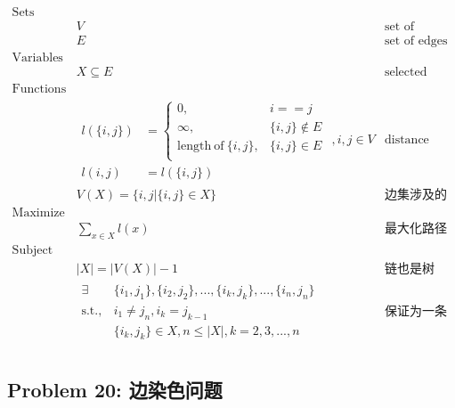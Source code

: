 \documentclass[11pt]{article}
\begin{document}
\begin{eqnarray*}
    \textrm{Sets} \\
        & V & \textrm{set of vertices} \\
        & E & \textrm{set of edges} \\
    \textrm{Variables} \\
        & X \subseteq E & \textrm{selected edges} \\
    \textrm{Functions} \\
        & \begin{array}{rl}
            l(\{i, j\}) &= \left\{
                \begin{array}{ll}
                    0,                              & i == j \\
                    \infty,                         & \{i, j\} \notin E \\
                    \mathrm{length\ of\ }\{i, j\},  & \{i, j\} \in E \\
                \end{array}
            \right. \\
            l(i, j) &= l(\{i, j\})
        \end{array}, i, j \in V & \textrm{distance between vertices} \\
        & V(X) = \{i, j | \{i, j\} \in X\} & \textrm{边集涉及的点集} \\
    \textrm{Maximize} \\
        & \displaystyle \sum_{x \in X} l(x) & \textrm{最大化路径长度} \\
    \textrm{Subject to} \\ 
        & |X| = |V(X)| - 1 & \textrm{链也是树} \\
        & \begin{array}{rl}
            \exists & \{i_1, j_1\}, \{i_2, j_2\}, ..., \{i_k, j_k\}, ..., \{i_n, j_n\} \\
            \mathrm{s.t.,} & i_1 \neq j_n, i_k = j_{k-1}\\
                    & \{i_k, j_k\} \in X, n \leq |X|, k = 2, 3, ..., n
        \end{array} & \textrm{保证为一条路径} \\ 
\end{eqnarray*}


\newpage
\subsection*{Problem 20: 边染色问题}
\end{document}
